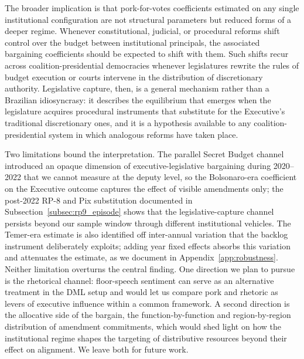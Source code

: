 \documentclass[pdflatex,sn-basic]{sn-jnl}
\begin{document}
The broader implication is that pork-for-votes coefficients estimated on any single institutional configuration are not structural parameters but reduced forms of a deeper regime. Whenever constitutional, judicial, or procedural reforms shift control over the budget between institutional principals, the associated bargaining coefficients should be expected to shift with them. Such shifts recur across coalition-presidential democracies whenever legislatures rewrite the rules of budget execution or courts intervene in the distribution of discretionary authority. Legislative capture, then, is a general mechanism rather than a Brazilian idiosyncrasy: it describes the equilibrium that emerges when the legislature acquires procedural instruments that substitute for the Executive's traditional discretionary ones, and it is a hypothesis available to any coalition-presidential system in which analogous reforms have taken place.

Two limitations bound the interpretation. The parallel Secret Budget channel introduced an opaque dimension of executive-legislative bargaining during 2020--2022 that we cannot measure at the deputy level, so the Bolsonaro-era coefficient on the Executive outcome captures the effect of visible amendments only; the post-2022 RP-8 and Pix substitution documented in Subsection~\ref{subsec:rp9_episode} shows that the legislative-capture channel persists beyond our sample window through different institutional vehicles. The Temer-era estimate is also identified off inter-annual variation that the backlog instrument deliberately exploits; adding year fixed effects absorbs this variation and attenuates the estimate, as we document in Appendix~\ref{app:robustness}. Neither limitation overturns the central finding. One direction we plan to pursue is the rhetorical channel: floor-speech sentiment can serve as an alternative treatment in the DML setup and would let us compare pork and rhetoric as levers of executive influence within a common framework. A second direction is the allocative side of the bargain, the function-by-function and region-by-region distribution of amendment commitments, which would shed light on how the institutional regime shapes the targeting of distributive resources beyond their effect on alignment. We leave both for future work.



\clearpage

\appendix
\renewcommand{\thesection}{\Alph{section}}
\renewcommand{\sectionautorefname}{Appendix}
\setcounter{section}{0}
\renewcommand{\thesection}{Appendix \Alph{section}}
\end{document}
